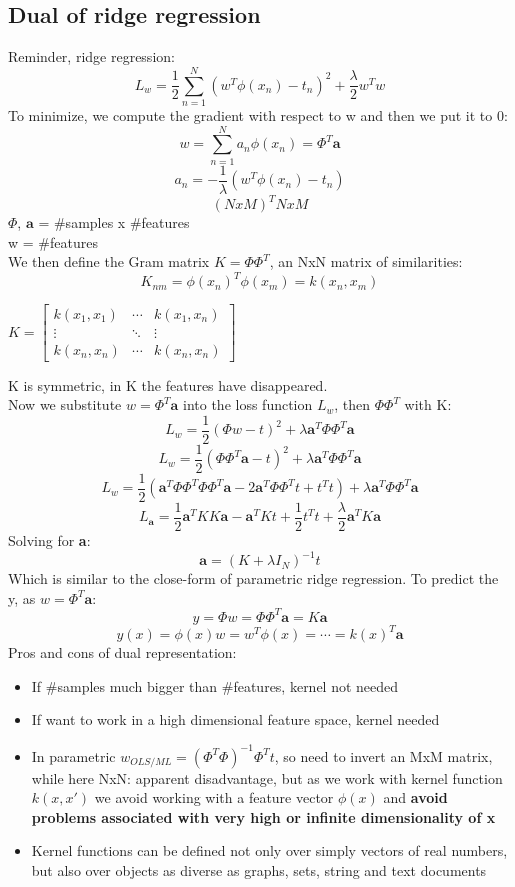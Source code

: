 \subsection{Dual of ridge regression}
    Reminder, ridge regression:
    $$L_{w}=\frac{1}{2}\sum_{n=1}^{N}(w^T\phi(x_n)-t_n)^2+\frac{\lambda}{2}w^Tw$$
    To minimize, we compute the gradient with respect to w and then we put it to 0:
    $$w=\sum_{n=1}^Na_n\phi(x_n)=\Phi^T\textbf{a}$$ $$a_n=-\frac{1}{\lambda}(w^T\phi(x_n)-t_n)$$ $$(NxM)^TNxM$$
    $\Phi$, $\textbf{a}$ = \#samples x \#features \\
    w = \#features\\
    We then define the Gram matrix $K=\Phi\Phi^T$, an NxN matrix of similarities:
    $$K_{nm}=\phi(x_n)^T\phi(x_m)=k(x_n,x_m)$$
    \begin{center}        
        $
        K=
        \begin{bmatrix}
            k(x_1,x_1) & \cdots & k(x_1,x_n) \\
            \vdots & \ddots & \vdots \\
            k(x_n,x_n) & \cdots & k(x_n,x_n)
        \end{bmatrix}
        $
    \end{center}
    K is symmetric, in K the features have disappeared.\\
    Now we substitute $w=\Phi^T\textbf{a}$ into the loss function $L_w$, then $\Phi\Phi^T$ with K:
    $$L_w=\frac{1}{2}(\Phi w-t)^2+\lambda\textbf{a}^T\Phi\Phi^T\textbf{a}$$
    $$L_w=\frac{1}{2}(\Phi\Phi^T\textbf{a}-t)^2+\lambda\textbf{a}^T\Phi\Phi^T\textbf{a}$$
    $$L_w=\frac{1}{2}(\textbf{a}^T\Phi\Phi^T\Phi\Phi^T\textbf{a}-2\textbf{a}^T\Phi\Phi^Tt+t^Tt)+\lambda\textbf{a}^T\Phi\Phi^T\textbf{a}$$
    $$L_{\textbf{a}}=\frac{1}{2}\textbf{a}^TKK\textbf{a}-\textbf{a}^TKt+\frac{1}{2}t^Tt+\frac{\lambda}{2}\textbf{a}^TK\textbf{a}$$
    Solving for \textbf{a}:
    $$\textbf{a}=(K+\lambda I_N)^{-1}t$$
    Which is similar to the close-form of parametric ridge regression. To predict the y, as $w=\Phi^T\textbf{a}$:
    $$y=\Phi w=\Phi\Phi^T\textbf{a}=K\textbf{a}$$ $$y(x)=\phi(x)w=w^T\phi(x)=\cdots=k(x)^T\textbf{a}$$
    Pros and cons of dual representation:
    \begin{itemize}
        \item If \#samples much bigger than \#features, kernel not needed
        \item If want to work in a high dimensional feature space, kernel needed
        \item In parametric $w_{OLS/ML}=(\Phi^T\Phi)^{-1}\Phi^Tt$, so need to invert an MxM matrix, while here NxN: apparent disadvantage, but as we work with kernel function $k(x,x')$ we avoid working with a feature vector $\phi(x)$ and \textbf{avoid problems associated with very high or infinite dimensionality of x}
        \item Kernel functions can be defined not only over simply vectors of real numbers, but also over objects as diverse as graphs, sets, string and text documents
    \end{itemize}


